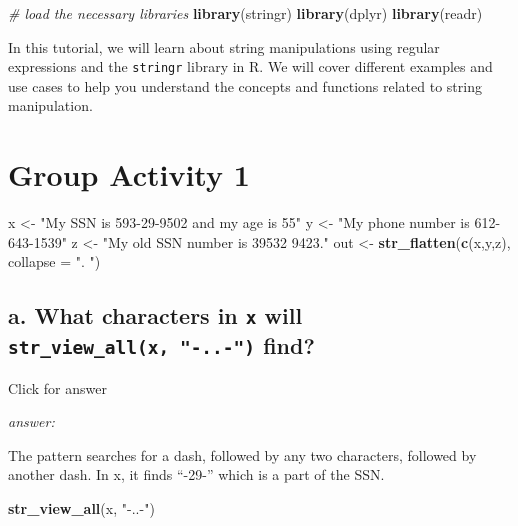 \documentclass[
]{book}
\newenvironment{Shaded}{\begin{snugshade}}{\end{snugshade}}
\newcommand{\AttributeTok}[1]{\textcolor[rgb]{0.13,0.29,0.53}{#1}}
\newcommand{\CommentTok}[1]{\textcolor[rgb]{0.56,0.35,0.01}{\textit{#1}}}
\newcommand{\FunctionTok}[1]{\textcolor[rgb]{0.13,0.29,0.53}{\textbf{#1}}}
\newcommand{\NormalTok}[1]{#1}
\newcommand{\OtherTok}[1]{\textcolor[rgb]{0.56,0.35,0.01}{#1}}
\newcommand{\StringTok}[1]{\textcolor[rgb]{0.31,0.60,0.02}{#1}}
\begin{document}
\begin{Shaded}
\begin{Highlighting}[]
\CommentTok{\# load the necessary libraries}
\FunctionTok{library}\NormalTok{(stringr)}
\FunctionTok{library}\NormalTok{(dplyr)}
\FunctionTok{library}\NormalTok{(readr)}
\end{Highlighting}
\end{Shaded}

In this tutorial, we will learn about string manipulations using regular expressions and the \texttt{stringr} library in R. We will cover different examples and use cases to help you understand the concepts and functions related to string manipulation.

\hypertarget{group-activity-1}{%
\section{Group Activity 1}\label{group-activity-1}}

\begin{Shaded}
\begin{Highlighting}[]
\NormalTok{x }\OtherTok{\textless{}{-}} \StringTok{"My SSN is 593{-}29{-}9502 and my age is 55"}
\NormalTok{y }\OtherTok{\textless{}{-}} \StringTok{"My phone number is 612{-}643{-}1539"}
\NormalTok{z }\OtherTok{\textless{}{-}} \StringTok{"My old SSN number is 39532 9423."}
\NormalTok{out }\OtherTok{\textless{}{-}} \FunctionTok{str\_flatten}\NormalTok{(}\FunctionTok{c}\NormalTok{(x,y,z), }\AttributeTok{collapse =} \StringTok{". "}\NormalTok{)}
\end{Highlighting}
\end{Shaded}

\hypertarget{a.-what-characters-in-x-will-str_view_allx--..--find}{%
\subsection{\texorpdfstring{a. What characters in \texttt{x} will \texttt{str\_view\_all(x,\ "-..-")} find?}{a. What characters in x will str\_view\_all(x, "-..-") find?}}\label{a.-what-characters-in-x-will-str_view_allx--..--find}}

Click for answer

\emph{answer:}

The pattern searches for a dash, followed by any two characters, followed by another dash. In x, it finds ``-29-'' which is a part of the SSN.

\begin{Shaded}
\begin{Highlighting}[]
\FunctionTok{str\_view\_all}\NormalTok{(x, }\StringTok{"{-}..{-}"}\NormalTok{)}
\end{Highlighting}
\end{Shaded}
\end{document}
